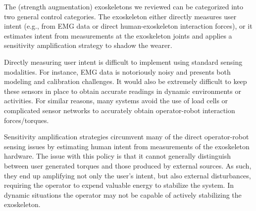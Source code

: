 \documentclass[letterpaper,12pt,fullpage]{article}
\begin{document}
The (strength augmentation) exoskeletons we reviewed can be categorized into two general control categories.  The exoskeleton either directly measures user intent (e.g., from EMG data or direct human-exoskeleton interaction forces), or it estimates intent from measurements at the exoskeleton joints and applies a sensitivity amplification strategy to shadow the wearer.  

Directly measuring user intent is difficult to implement using standard sensing modalities.  For instance, EMG data is notoriously noisy and presents both modeling and calibration challenges.  It would also be extremely difficult to keep these sensors in place to obtain accurate readings in dynamic environments or activities.  For similar reasons, many systems avoid the use of load cells or complicated sensor networks to accurately obtain operator-robot interaction forces/torques.  

Sensitivity amplification strategies circumvent many of the direct operator-robot sensing issues by estimating human intent from measurements of the exoskeleton hardware. The issue with this policy is that it cannot generally distinguish between user generated torques and those produced by external sources.  As such, they end up amplifying not only the user's intent, but also external disturbances, requiring the operator to expend valuable energy to stabilize the system.  
In dynamic situations the operator may not be capable of actively stabilizing the exoskeleton.
\end{document}
